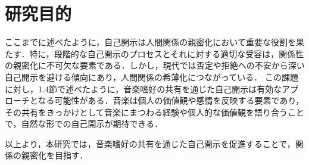 \section{研究目的}

ここまでに述べたように，自己開示は人間関係の親密化において重要な役割を果たす．特に，段階的な自己開示のプロセスとそれに対する適切な受容は，関係性の親密化に不可欠な要素である．しかし，現代では否定や拒絶への不安から深い自己開示を避ける傾向にあり，人間関係の希薄化につながっている．
この課題に対し，1.4節で述べたように，音楽嗜好の共有を通じた自己開示は有効なアプローチとなる可能性がある．音楽は個人の価値観や感情を反映する要素であり，その共有をきっかけとして音楽にまつわる経験や個人的な価値観を語り合うことで，自然な形での自己開示が期待できる．

以上より，本研究では，音楽嗜好の共有を通じた自己開示を促進することで，関係の親密化を目指す．